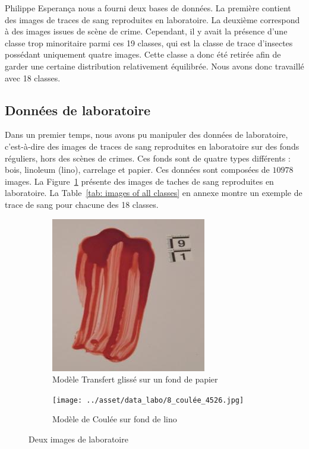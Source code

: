 
Philippe Esperança nous a fourni deux bases de données. La première contient des images de traces de sang reproduites en laboratoire. La deuxième correspond à des images issues de scène de crime.
Cependant, il y avait la présence d'une classe trop minoritaire parmi ces 19 classes, qui est la classe de trace d'insectes possédant uniquement quatre images. Cette classe a donc été retirée afin de garder une certaine distribution relativement équilibrée. Nous avons donc travaillé avec 18 classes.

\subsection{Données de laboratoire}

Dans un premier temps, nous avons pu manipuler des données de laboratoire, c'est-à-dire des images de traces de sang reproduites en laboratoire sur des fonds réguliers, hors des scènes de crimes. Ces fonds sont de quatre types différents : bois, linoleum (lino), carrelage et papier. Ces données sont composées de $10978$ images.
La Figure~\ref{fig: labs images} présente des images de taches de sang reproduites en laboratoire. La Table~\ref{tab: images of all classes} en annexe montre un exemple de trace de sang pour chacune des 18 classes.

\begin{figure}[ht]
    \centering
    \begin{subfigure}{0.40\linewidth}
        \centering
        \includegraphics[width=\linewidth]{../asset/data_labo/4_papier_1586.jpg}
        \caption{Modèle Transfert glissé sur un fond de papier}
    \end{subfigure}
    \begin{subfigure}{0.40\linewidth}
        \centering
        \texttt{[image: ../asset/data\_labo/8\_coulée\_4526.jpg]}
        \caption{Modèle de Coulée sur fond de lino}
    \end{subfigure}
    \caption{Deux images de laboratoire}
    \label{fig: labs images}
\end{figure}

